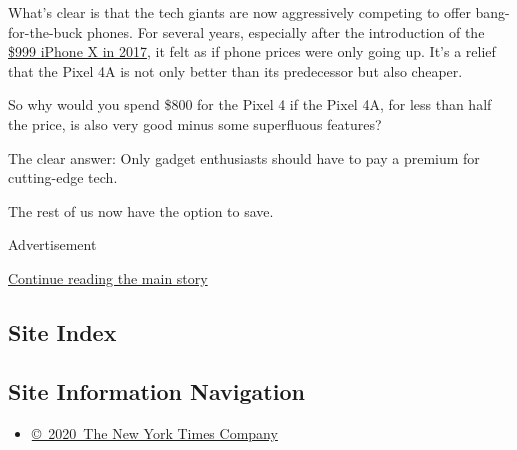 What's clear is that the tech giants are now aggressively competing to
offer bang-for-the-buck phones. For several years, especially after the
introduction of the
\href{https://www.nytimes.com/2017/11/01/technology/personaltech/apple-iphone-x-review.html}{\$999
iPhone X in 2017}, it felt as if phone prices were only going up. It's a
relief that the Pixel 4A is not only better than its predecessor but
also cheaper.

So why would you spend \$800 for the Pixel 4 if the Pixel 4A, for less
than half the price, is also very good minus some superfluous features?

The clear answer: Only gadget enthusiasts should have to pay a premium
for cutting-edge tech.

The rest of us now have the option to save.

Advertisement

\protect\hyperlink{after-bottom}{Continue reading the main story}

\hypertarget{site-index}{%
\subsection{Site Index}\label{site-index}}

\hypertarget{site-information-navigation}{%
\subsection{Site Information
Navigation}\label{site-information-navigation}}

\begin{itemize}
\tightlist
\item
  \href{https://help.nytimes.com/hc/en-us/articles/115014792127-Copyright-notice}{©~2020~The
  New York Times Company}
\end{itemize}

